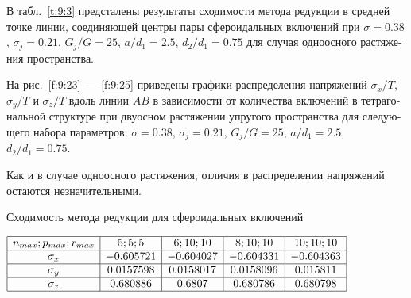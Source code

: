 \begin{russian}
%

В табл.~\ref{t:9:3} предсталены результаты сходимости метода редукции в средней точке линии, соединяющей центры пары сфероидальных включений при $\sigma=0.38$, $\sigma_j=0.21$, $G_j/G=25$, $a/d_1=2.5$, $d_2/d_1=0.75$ для случая одноосного растяжения пространства.

На рис.~\ref{f:9:23}~--- \ref{f:9:25} приведены графики распределения напряжений $\sigma_x/T$, $\sigma_y/T$ и $\sigma_z/T$ вдоль линии $AB$ в зависимости от количества включений в тетрагональной структуре при двуосном растяжении упругого пространства для следующего набора параметров: $\sigma=0.38$, $\sigma_j=0.21$, $G_j/G=25$, $a/d_1=2.5$, $d_2/d_1=0.75$.

Как и в случае одноосного растяжения, отличия в распределении напряжений остаются незначительными.

\begin{table}[h!]
\caption{Сходимость метода редукции для сфероидальных включений}
\centering
$
\begin{array}{|c|c|c|c|c|}
\hline
n_{max}; p_{max}; r_{max} & 5; 5; 5 & 6; 10; 10 & 8; 10; 10 & 10; 10; 10 \\
\hline
\sigma_x & -0.605721		& -0.604027 	& -0.604331 		& -0.604363 \\
\hline
\sigma_y & 0.0157598 		& 0.0158017 	& 0.0158096 	& 0.015811 \\
\hline
\sigma_z & 0.680886 		& 0.6807 		& 0.680786 		& 0.680798 \\
\hline
\end{array}
$
\label{t:9:3}
\end{table}


\end{russian}
